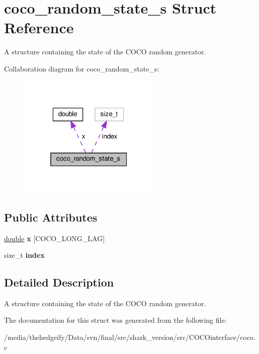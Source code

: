 \hypertarget{structcoco__random__state__s}{}\section{coco\+\_\+random\+\_\+state\+\_\+s Struct Reference}
\label{structcoco__random__state__s}


A structure containing the state of the C\+O\+CO random generator.  




Collaboration diagram for coco\+\_\+random\+\_\+state\+\_\+s\+:\nopagebreak
\begin{figure}[H]
\begin{center}
\leavevmode
\includegraphics[width=193pt]{structcoco__random__state__s__coll__graph}
\end{center}
\end{figure}
\subsection*{Public Attributes}
\begin{DoxyCompactItemize}
\item 
\hyperlink{classdouble}{double} {\bfseries x} \mbox{[}C\+O\+C\+O\+\_\+\+L\+O\+N\+G\+\_\+\+L\+AG\mbox{]}\hypertarget{structcoco__random__state__s_a809866eac908dbecb378e26eabef424b}{}\label{structcoco__random__state__s_a809866eac908dbecb378e26eabef424b}

\item 
size\+\_\+t {\bfseries index}\hypertarget{structcoco__random__state__s_a1e18d711bf9c7e7d267b33f95c220bbb}{}\label{structcoco__random__state__s_a1e18d711bf9c7e7d267b33f95c220bbb}

\end{DoxyCompactItemize}


\subsection{Detailed Description}
A structure containing the state of the C\+O\+CO random generator. 

The documentation for this struct was generated from the following file\+:\begin{DoxyCompactItemize}
\item 
/media/thehedgeify/\+Data/svn/final/src/shark\+\_\+version/src/\+C\+O\+C\+Ointerface/coco.\+c\end{DoxyCompactItemize}
